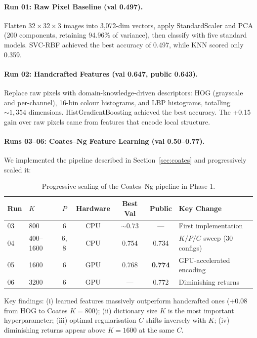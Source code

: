 \documentclass[11pt,a4paper]{article}
\begin{document}
\paragraph{Run 01: Raw Pixel Baseline (val 0.497).}
Flatten $32 \times 32 \times 3$ images into 3,072-dim vectors, apply
StandardScaler and PCA (200 components, retaining 94.96\% of variance), then
classify with five standard models.  SVC-RBF achieved the best accuracy of
0.497, while KNN scored only 0.359.

\paragraph{Run 02: Handcrafted Features (val 0.647, public 0.643).}
Replace raw pixels with domain-knowledge-driven descriptors: HOG (grayscale and
per-channel), 16-bin colour histograms, and LBP histograms, totalling
$\sim\!1{,}354$ dimensions.  HistGradientBoosting achieved the best accuracy.
The +0.15 gain over raw pixels came from features that encode local structure.

\paragraph{Runs 03--06: Coates--Ng Feature Learning (val 0.50--0.77).}
We implemented the pipeline described in Section~\ref{sec:coates} and
progressively scaled it:

\begin{table}[H]
\centering
\caption{Progressive scaling of the Coates--Ng pipeline in Phase 1.}
\label{tab:phase1_coates}
\begin{tabular}{@{}llccccl@{}}
\toprule
Run & $K$ & $P$ & Hardware & Best Val & Public & Key Change \\
\midrule
03 & 800  & 6 & CPU & $\sim$0.73 & ---    & First implementation \\
04 & 400--1600 & 6, 8 & CPU & 0.754 & 0.734 & $K/P/C$ sweep (30 configs) \\
05 & 1600 & 6 & GPU & 0.768 & \textbf{0.774} & GPU-accelerated encoding \\
06 & 3200 & 6 & GPU & ---   & 0.772 & Diminishing returns \\
\bottomrule
\end{tabular}
\end{table}

Key findings: (i) learned features massively outperform handcrafted ones
(+0.08 from HOG to Coates $K\!=\!800$); (ii) dictionary size $K$ is the most
important hyperparameter; (iii) optimal regularisation $C$ shifts inversely
with $K$; (iv) diminishing returns appear above $K\!=\!1600$ at the same $C$.
\end{document}
